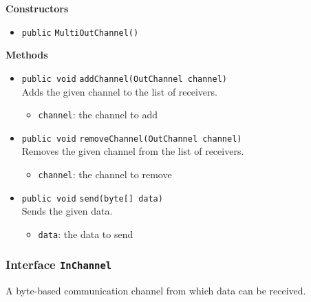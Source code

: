 \textbf{Constructors}
\begin{itemize}
\item \lstinline|public| \lstinline|MultiOutChannel|\lstinline|()|




\end{itemize}


\textbf{Methods}
\begin{itemize}
\item \lstinline|public void| \lstinline|addChannel|\lstinline|(OutChannel channel)|\\
Adds the given channel to the list of receivers.
\begin{itemize}
\item \lstinline|channel|: the channel to add
\end{itemize}



\item \lstinline|public void| \lstinline|removeChannel|\lstinline|(OutChannel channel)|\\
Removes the given channel from the list of receivers.
\begin{itemize}
\item \lstinline|channel|: the channel to remove
\end{itemize}



\item \lstinline|public void| \lstinline|send|\lstinline|(byte[] data)|\\
Sends the given data.
\begin{itemize}
\item \lstinline|data|: the data to send
\end{itemize}



\end{itemize}

\subsubsection{Interface \lstinline|InChannel|}
A byte-based communication channel from which data can be received. \\






